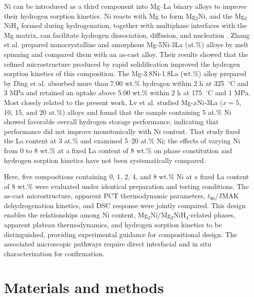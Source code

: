 \documentclass[preprint,12pt]{elsarticle}
\begin{document}
Ni can be introduced as a third component into Mg--La binary alloys to improve their hydrogen sorption kinetics. Ni reacts with Mg to form Mg$_2$Ni, and the Mg$_2$NiH$_4$ formed during hydrogenation, together with multiphase interfaces with the Mg matrix, can facilitate hydrogen dissociation, diffusion, and nucleation \cite{ref11,ref12}. Zhang et al. \cite{ref7} prepared nanocrystalline and amorphous Mg-5Ni-3La (at.\%) alloys by melt spinning and compared them with an as-cast alloy. Their results showed that the refined microstructure produced by rapid solidification improved the hydrogen sorption kinetics of this composition. The Mg-3.8Ni-1.8La (wt.\%) alloy prepared by Ding et al. \cite{ref12} absorbed more than 7.00 wt.\% hydrogen within 2 h at 325~$^{\circ}$C and 3 MPa and retained an uptake above 5.00 wt.\% within 2 h at 175~$^{\circ}$C and 1 MPa. Most closely related to the present work, Lv et al. \cite{ref15} studied Mg-$x$Ni-3La ($x=5$, 10, 15, and 20 at.\%) alloys and found that the sample containing 5 at.\% Ni showed favorable overall hydrogen storage performance, indicating that performance did not improve monotonically with Ni content. That study fixed the La content at 3 at.\% and examined 5--20 at.\% Ni; the effects of varying Ni from 0 to 8 wt.\% at a fixed La content of 8 wt.\% on phase constitution and hydrogen sorption kinetics have not been systematically compared.

Here, five compositions containing 0, 1, 2, 4, and 8 wt.\% Ni at a fixed La content of 8 wt.\% were evaluated under identical preparation and testing conditions. The as-cast microstructure, apparent PCT thermodynamic parameters, $t_{90}$/JMAK dehydrogenation kinetics, and DSC response were jointly compared. This design enables the relationships among Ni content, Mg$_2$Ni/Mg$_2$NiH$_4$-related phases, apparent plateau thermodynamics, and hydrogen sorption kinetics to be distinguished, providing experimental guidance for compositional design. The associated microscopic pathways require direct interfacial and in situ characterization for confirmation.

\section{Materials and methods}
\end{document}

